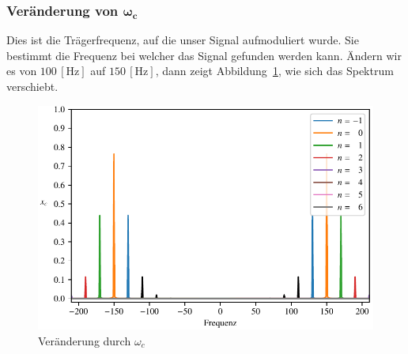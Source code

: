 \subsubsection{Veränderung von $\bm{\omega_c}$}
Dies ist die Trägerfrequenz, auf die unser Signal aufmoduliert wurde.
Sie bestimmt die Frequenz bei welcher das Signal gefunden werden kann. 
Ändern wir es von \( 100\,[\text{Hz}] \) auf \(150\,[\text{Hz}]\),
dann zeigt
Abbildung~\ref{fig:fm:fc_150}, wie sich das Spektrum verschiebt.
\begin{figure}[h]
	\centering
	\includegraphics{papers/fm/images/fc150.pdf}
	\caption{Veränderung durch \(\omega_c\)}
	\label{fig:fm:fc_150}
\end{figure}

